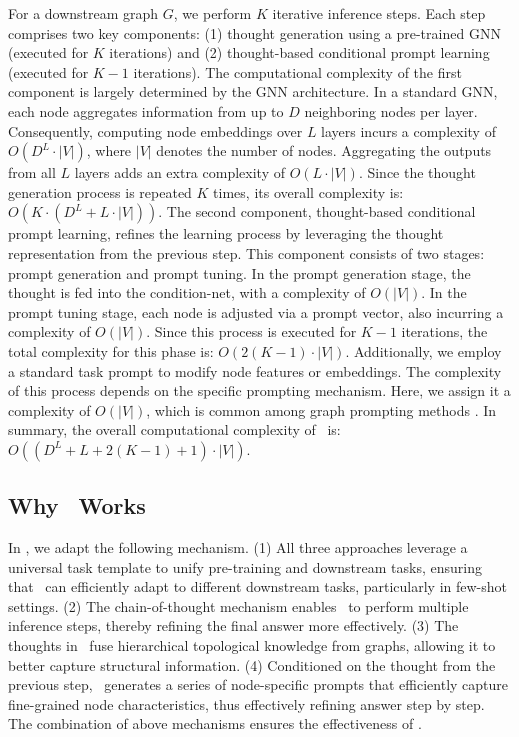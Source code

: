 For a downstream graph \( G \), we perform \( K \) iterative inference steps. Each step comprises two key components: (1) thought generation using a pre-trained GNN (executed for \( K \) iterations) and (2) thought-based conditional prompt learning (executed for \( K-1 \) iterations).
The computational complexity of the first component is largely determined by the GNN architecture. In a standard GNN, each node aggregates information from up to \( D \) neighboring nodes per layer. Consequently, computing node embeddings over \( L \) layers incurs a complexity of \( O(D^L \cdot |V|) \), where \( |V| \) denotes the number of nodes. Aggregating the outputs from all \( L \) layers adds an extra complexity of \( O(L\cdot |V|) \). Since the thought generation process is repeated \( K \) times, its overall complexity is:$O(K\cdot (D^L+L \cdot |V| ))$.
The second component, thought-based conditional prompt learning, refines the learning process by leveraging the thought representation from the previous step. This component consists of two stages: prompt generation and prompt tuning. In the prompt generation stage, the thought is fed into the condition-net, with a complexity of \( O(|V|) \). In the prompt tuning stage, each node is adjusted via a prompt vector, also incurring a complexity of \( O(|V|) \). Since this process is executed for \( K-1 \) iterations, the total complexity for this phase is: $O(2(K-1) \cdot |V|)$.
Additionally, we employ a standard task prompt to modify node features or embeddings. The complexity of this process depends on the specific prompting mechanism. Here, we assign it a complexity of \(O(|V|)\), which is common among graph prompting methods \cite{liu2023graphprompt,fang2024universal}.
In summary, the overall computational complexity of \model\ is: $O((D^L+L + 2(K-1) + 1) \cdot |V|)$.

\subsection{Why \model\ Works}
In \model, we adapt the following mechanism. (1) All three approaches leverage a universal task template to unify pre-training and downstream tasks, ensuring that \model\ can efficiently adapt to different downstream tasks, particularly in few-shot settings. (2) The chain-of-thought mechanism enables \model\ to perform multiple inference steps, thereby refining the final answer more effectively. (3) The thoughts in \model\ fuse hierarchical topological knowledge from graphs, allowing it to better capture structural information. (4) Conditioned on the thought from the previous step, \model\ generates a series of node-specific prompts that efficiently capture fine-grained node characteristics, thus effectively refining answer step by step. The combination of above mechanisms ensures the effectiveness of \model.



